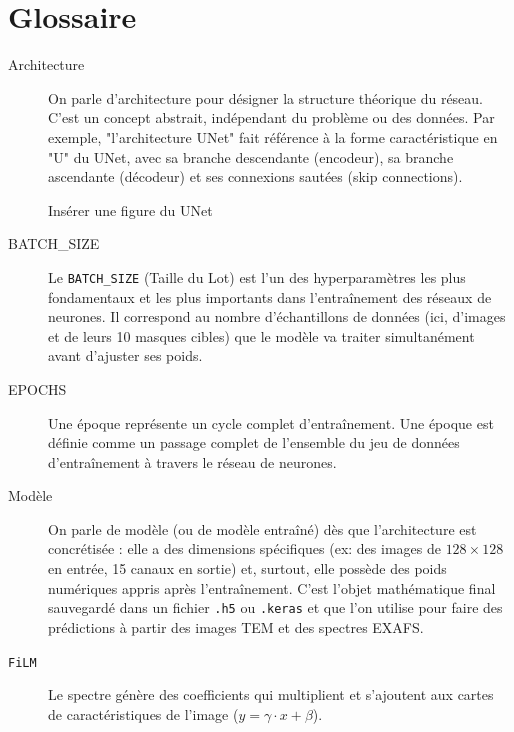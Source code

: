\documentclass[12pt,a4paper,french]{book}
\newenvironment{todobox}
{\begin{tcolorbox}[colback=lightcyan, colframe=darkcyan, 
		title=\textbf{[>] To Do}, boxrule=1.5pt]}
{\end{tcolorbox}}
\begin{document}
\chapter{Glossaire}
\begin{description}
	\item[Architecture] On parle d'architecture pour désigner la structure théorique du réseau. C'est un concept abstrait, indépendant du problème ou des données. Par exemple, "l'architecture UNet" fait référence à la forme caractéristique en "U" du UNet, avec sa branche descendante (encodeur), sa branche ascendante (décodeur) et ses connexions sautées (skip connections).
	\begin{todobox} Insérer une figure du UNet\end{todobox}
	
	\item[BATCH\_SIZE] Le \verb+BATCH_SIZE+ (Taille du Lot) est l'un des hyperparamètres les plus fondamentaux et les plus importants dans l'entraînement des réseaux de neurones. Il correspond au nombre d'échantillons de données (ici, d'images et de leurs 10 masques cibles) que le modèle va traiter simultanément avant d'ajuster ses poids.
	
	\item[EPOCHS] Une époque représente un cycle complet d'entraînement. Une époque est définie comme un passage complet de l'ensemble du jeu de données d'entraînement à travers le réseau de neurones.
	
	\item[Modèle] On parle de modèle (ou de modèle entraîné) dès que l'architecture est concrétisée : elle a des dimensions spécifiques (ex: des images de $128 \times 128$ en entrée, 15 canaux en sortie) et, surtout, elle possède des poids numériques appris après l'entraînement. C'est l'objet mathématique final sauvegardé dans un fichier \verb+.h5+ ou \verb+.keras+ et que l'on utilise pour faire des prédictions à partir des images TEM et des spectres EXAFS.
	\cprotect\item[\verb+FiLM+] Le spectre génère des coefficients qui multiplient et s'ajoutent aux cartes de caractéristiques de l'image ($y=\gamma\cdot x+\beta$).
\end{description}

 

\end{document}
